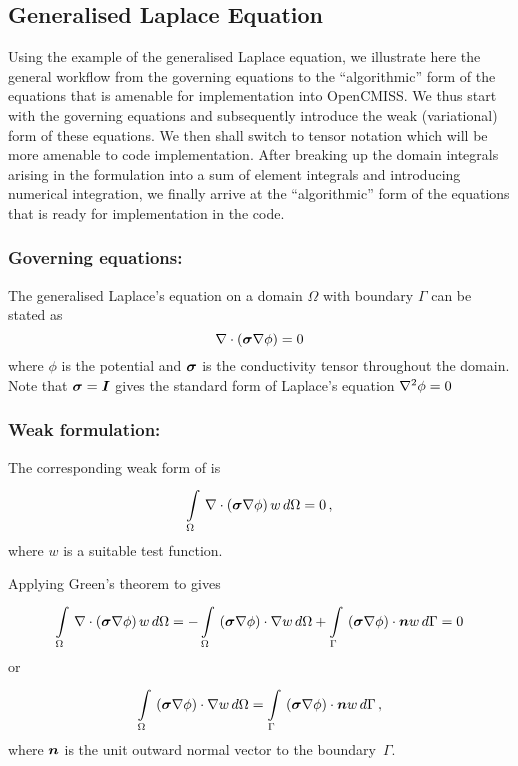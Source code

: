 \subsection{Generalised Laplace Equation}

Using the example of the generalised Laplace equation,
we illustrate here the general workflow from the governing equations
to the ``algorithmic'' form of the equations that is amenable
for implementation into OpenCMISS.
We thus start with the governing equations and subsequently introduce
the weak (variational) form of these equations.
We then shall switch to tensor notation which will be more amenable
to code implementation.
After breaking up the domain integrals arising in the formulation
into a sum of element integrals and introducing numerical integration,
we finally arrive at the ``algorithmic'' form of the equations
that is ready for implementation in the code.


\subsubsection{Governing equations:}
The generalised Laplace's equation on a domain $\Omega$ with boundary $\Gamma$
can be stated as
\begin{equation}
   \nabla\cdot\left( \boldsymbol{\sigma}\nabla \phi \right) =0
  \label{eqn:Laplacesequation}
\end{equation}
where $\phi$ is the potential and $\boldsymbol{\sigma}$ is
the conductivity tensor throughout the domain. Note that 
$\boldsymbol{\sigma}=\boldsymbol{I}$ gives the standard form of Laplace's equation \ie $\nabla^{2} {\phi}=0$

\subsubsection{Weak formulation:}
The corresponding weak form of  is
\begin{equation}
    \displaystyle\int\limits_{\Omega}^{} \, \nabla\cdot\left( \boldsymbol{\sigma}\nabla \phi \right) w\,d\Omega =0 \,,
  \label{eqn:Laplaceweakform}
\end{equation}
where $w$ is a suitable test function.

Applying Green's theorem to  gives
\begin{equation}
 \gint{\Omega}{}{\diverg{\pbrac{\tensor{\sigma}\gradient{\phi}}}w}{\Omega}
 = -\gint{\Omega}{}{\dotprod{\pbrac{\tensor{\sigma}\gradient{\phi}}}{\gradient{w}}}{\Omega}
   +\gint{\Gamma}{}{\dotprod{\pbrac{\tensor{\sigma}\gradient{\phi}}}{\vect{n}}w}{\Gamma}
 = 0
\end{equation}
or
\begin{equation}
  \gint{\Omega}{}{\dotprod{\pbrac{\tensor{\sigma}\gradient{\phi}}}{\gradient{w}}}{\Omega}
  = \gint{\Gamma}{}{\dotprod{\pbrac{\tensor{\sigma}\gradient{\phi}}}{\vect{n}w}}{\Gamma} \,,
  \label{eqn:Laplaceweightedresidualform}
\end{equation}
where $\vect{n}$ is the unit outward normal vector to the boundary~$\Gamma$.

